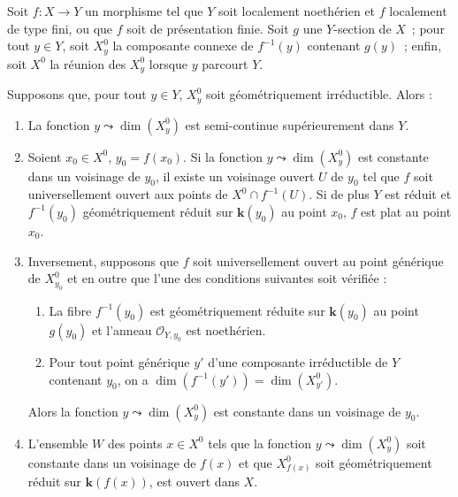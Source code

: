 \begin{proposition}[15.6.6]
Soit $f:X\to Y$ un morphisme tel que $Y$ soit localement noethérien et $f$ localement de type fini, \textup{ou} que $f$ soit de présentation finie. Soit $g$ une $Y$-section de $X$~; pour tout $y\in Y$, soit $X_y^0$ la composante connexe de $f^{-1}(y)$ contenant $g(y)$~; enfin, soit $X^0$ la réunion des $X_y^0$ lorsque $y$ parcourt $Y$.

Supposons que, pour tout $y\in Y$, $X_y^0$ soit géométriquement irréductible. Alors :
\begin{enumerate}[label=\emph{(\roman*)}]
  \item La fonction $y\leadsto\dim(X_y^0)$ est semi-continue supérieurement dans $Y$.
  \item Soient $x_0\in X^0$, $y_0=f(x_0)$. Si la fonction $y\leadsto\dim(X_y^0)$ est constante dans un voisinage de $y_0$, il existe un voisinage ouvert $U$ de $y_0$ tel que $f$ soit universellement ouvert aux points de $X^0\cap f^{-1}(U)$. Si de plus $Y$ est réduit et $f^{-1}(y_0)$ géométriquement réduit sur $\boldsymbol{k}(y_0)$ au point $x_0$, $f$ est plat au point $x_0$.
  \item Inversement, supposons que $f$ soit universellement ouvert au point générique de $X_{y_0}^0$ et en outre que \textup{l'une} des conditions suivantes soit vérifiée :
  \begin{enumerate}
    \item[$\alpha$)] La fibre $f^{-1}(y_0)$ est géométriquement réduite sur $\boldsymbol{k}(y_0)$ au point $g(y_0)$ et l'anneau $\mathcal O_{Y,y_0}$ est noethérien.
    \item[$\beta$)] Pour tout point générique $y'$ d'une composante irréductible de $Y$ contenant $y_0$, on a $\dim(f^{-1}(y'))=\dim(X_{y'}^0)$.
  \end{enumerate}
  Alors la fonction $y\leadsto\dim(X_y^0)$ est constante dans un voisinage de $y_0$.
  \item L'ensemble $W$ des points $x\in X^0$ tels que la fonction $y\leadsto\dim(X_y^0)$ soit constante dans un voisinage de $f(x)$ et que $X_{f(x)}^0$ soit géométriquement réduit sur $\boldsymbol{k}(f(x))$, est ouvert dans $X$.
\end{enumerate}
\end{proposition}

